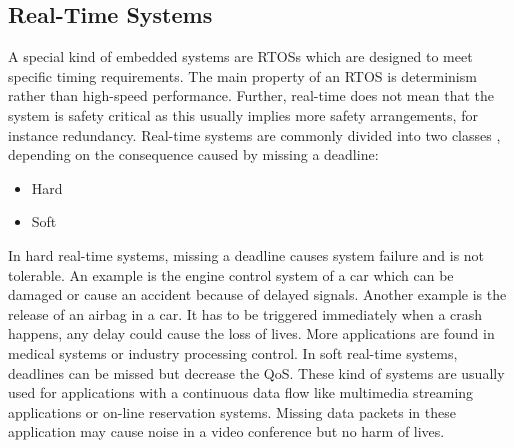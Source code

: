 \subsection{Real-Time Systems}
A special kind of embedded systems are \acp{RTOS} which are designed to meet specific timing requirements. 
The main property of an \ac{RTOS} is determinism rather than high-speed performance.  
Further, real-time does not mean that the system is safety critical as this usually implies more safety arrangements, for instance redundancy.
Real-time systems are commonly divided into two classes \cite{stromblad:elfrtoemd}, depending on the consequence caused by missing a deadline:
\begin{itemize}
	\item Hard
	\item Soft
\end{itemize}
In hard real-time systems, missing a deadline causes system failure and is not tolerable.  
An example is the engine control system of a car which can be damaged or cause an accident because of delayed signals.
Another example is the release of an airbag in a car. 
It has to be triggered immediately when a crash happens, any delay could cause the loss of lives. 
More applications are found in medical systems or industry processing control.  
In soft real-time systems, deadlines can be missed but decrease the \ac{QoS}. 
These kind of systems are usually used for applications with a continuous data flow like multimedia streaming applications or on-line reservation systems.
Missing data packets in these application may cause noise in a video conference but no harm of lives.

